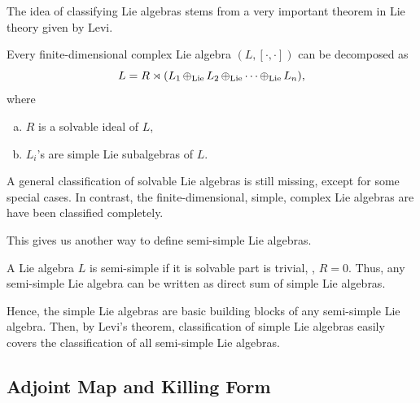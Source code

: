 The idea of classifying Lie algebras stems from a very important theorem in Lie theory given by Levi.
\begin{theorem}
    Every finite-dimensional complex Lie algebra \((L, [\cdot, \cdot])\) can be decomposed as
    \begin{equation*}
        L = R \rtimes (L_1 \operatorname{\oplus_{\mathrm{Lie}}} L_2 \operatorname{\oplus_{\mathrm{Lie}}} \cdots \operatorname{\oplus_{\mathrm{Lie}}} L_n),
    \end{equation*}
    where
    \begin{enumerate}[(a)]
        \item \(R\) is a solvable ideal of \(L\),
        \item \(L_i\)'s are simple Lie subalgebras of \(L\).
    \end{enumerate}
\end{theorem}
A general classification of solvable Lie algebras is still missing, except for some special cases. In contrast, the finite-dimensional, simple, complex Lie algebras are have been classified completely.

This gives us another way to define semi-simple Lie algebras.
\begin{proposition}
    A Lie algebra \(L\) is semi-simple if it is solvable part is trivial, \ie, \(R = \qty{0}\). Thus, any semi-simple Lie algebra can be written as direct sum of simple Lie algebras.
\end{proposition}
Hence, the simple Lie algebras are basic building blocks of any semi-simple Lie algebra. Then, by Levi's theorem, classification of simple Lie algebras easily covers the classification of all semi-simple Lie algebras.


\subsection{Adjoint Map and Killing Form}
